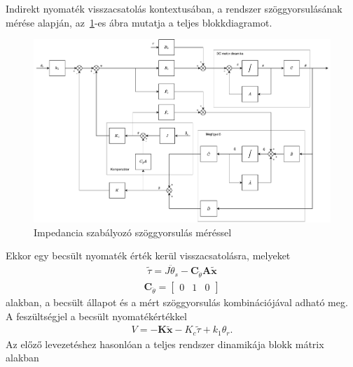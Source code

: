 Indirekt nyomaték visszacsatolás kontextusában, a rendszer szöggyorsulásának mérése alapján,
az~\ref{fig:block_diagram_indirect_compensation}-es ábra mutatja a teljes blokkdiagramot.
\begin{figure}[ht]
    \begin{center}
    \includegraphics[width=\textwidth]{images/compensated_position_controller_angular_acceleration.pdf}
    \caption{Impedancia szabályozó szöggyorsulás méréssel}\label{fig:block_diagram_indirect_compensation}
    \end{center}
\end{figure}
Ekkor egy becsült nyomaték érték kerül visszacsatolásra, melyeket
\begin{align}
    \tilde \tau = J \ddot \theta_s - \bm C_{\ddot\theta} \bm A \tilde{\bm x}
\end{align}
\begin{align}
    \bm C_{\ddot\theta} = 
    \begin{bmatrix}
        0 & 1 & 0
    \end{bmatrix}
\end{align}
alakban, a becsült állapot és a mért szöggyorsulás kombinációjával adható meg.
A feszültségjel a becsült nyomatékértékkel
\begin{align}
    V = -\bm K \tilde{\bm x} -K_c \tilde \tau + k_1 \theta_r.
\end{align}
Az előző levezetéshez hasonlóan a teljes rendszer dinamikája blokk mátrix alakban
